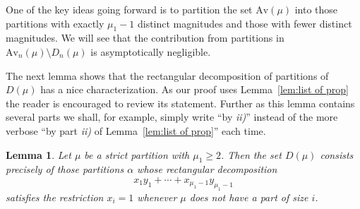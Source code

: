 \documentclass{article}
\theoremstyle{plain}
\newtheorem{lemma}[theorem]{Lemma}
\theoremstyle{definition}
\newcommand{\Av}{\text{Av}}
\begin{document}
One of the key ideas going forward is to partition the set $\Av(\mu)$ into those partitions with exactly $\mu_1-1$ distinct magnitudes and those with fewer distinct magnitudes.  We will see that the contribution from partitions in $\Av_n(\mu)\setminus D_n(\mu)$ is asymptotically negligible.  

The next lemma shows that the rectangular decomposition of partitions of $D(\mu)$ has a nice characterization.  As our proof uses Lemma~\ref{lem:list of prop} the reader is encouraged to review its statement.  Further as this lemma contains several parts we shall, for example, simply write ``by \emph{ii)}'' instead of the more verbose ``by part \emph{ii)} of Lemma~\ref{lem:list of prop}'' each time.   

\begin{lemma}\label{lem:rd of mu}
Let $\mu$ be a strict partition with $\mu_1\geq 2$.  Then the set $D(\mu)$ consists precisely of those partitions $\alpha$ whose rectangular decomposition $$x_1y_1+\cdots + x_{\mu_1-1}y_{\mu_1-1}$$
satisfies the restriction $x_i=1$ whenever $\mu$ does not have a part of size $i$.
\end{lemma}
\end{document}

